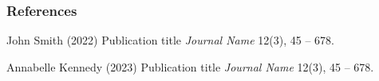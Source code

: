 \documentclass[
	11pt, %
]{beamer}
\begin{document}
\begin{frame} %
    \frametitle{References}

    \begin{thebibliography}{99} %
        \footnotesize %

        John Smith (2022)
        \newblock Publication title
        \newblock \emph{Journal Name} 12(3), 45 -- 678.

        Annabelle Kennedy (2023)
        \newblock Publication title
        \newblock \emph{Journal Name} 12(3), 45 -- 678.
    \end{thebibliography}
\end{frame}
\end{document}
